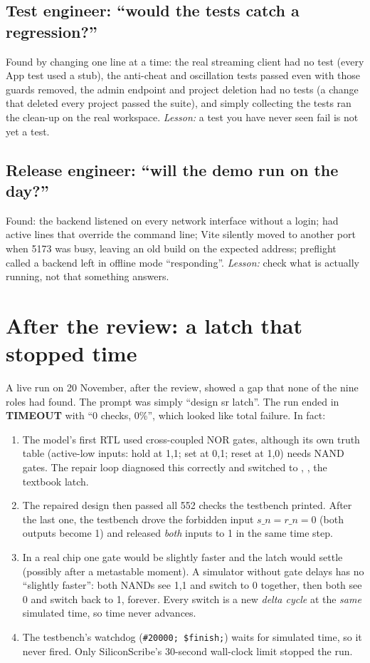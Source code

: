 \subsection*{Test engineer: ``would the tests catch a regression?''}
Found by changing one line at a time: the real streaming client had no test (every App test used a stub), the anti-cheat and oscillation tests passed even with those guards removed, the admin endpoint and project deletion had no tests (a change that deleted every project passed the suite), and simply collecting the tests ran the clean-up on the real workspace. \emph{Lesson:} a test you have never seen fail is not yet a test.

\subsection*{Release engineer: ``will the demo run on the day?''}
Found: the backend listened on every network interface without a login;  had active lines that override the command line; Vite silently moved to another port when 5173 was busy, leaving an old build on the expected address; preflight called a backend left in offline mode ``responding''. \emph{Lesson:} check what is actually running, not that something answers.

\section{After the review: a latch that stopped time}
\label{sec:latch-timeout}

A live run on 20 November, after the review, showed a gap that none of the nine roles had found. The prompt was simply ``design sr latch''. The run ended in \textbf{TIMEOUT} with ``0 checks, 0\%'', which looked like total failure. In fact:
\begin{enumerate}
  \item The model's first RTL used cross-coupled NOR gates, although its own truth table (active-low inputs: hold at 1,1; set at 0,1; reset at 1,0) needs NAND gates. The repair loop diagnosed this correctly and switched to , , the textbook latch.
  \item The repaired design then passed all 552 checks the testbench printed. After the last one, the testbench drove the forbidden input $s\_n = r\_n = 0$ (both outputs become 1) and released \emph{both} inputs to 1 in the same time step.
  \item In a real chip one gate would be slightly faster and the latch would settle (possibly after a metastable moment). A simulator without gate delays has no ``slightly faster'': both NANDs see 1,1 and switch to 0 together, then both see 0 and switch back to 1, forever. Every switch is a new \emph{delta cycle} at the \emph{same} simulated time, so time never advances.
  \item The testbench's watchdog (\texttt{\#20000; \$finish;}) waits for simulated time, so it never fired. Only SiliconScribe's 30-second wall-clock limit stopped the run.
\end{enumerate}

